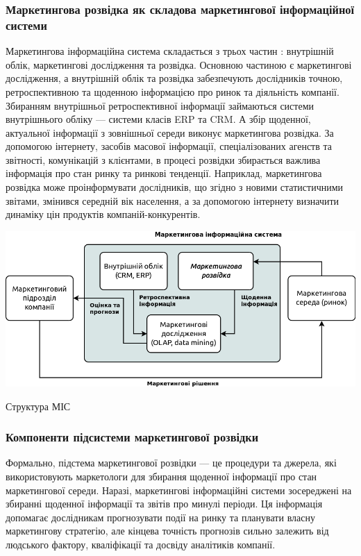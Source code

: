         \subsubsection{Маркетингова розвідка як складова маркетингової інформаційної системи}
Маркетингова інформаційна система складається з трьох частин \cite{kotler14}: внутрішній облік, маркетингові дослідження та розвідка. Основною частиною є маркетингові дослідження, а внутрішній облік та розвідка забезпечують дослідників точною, ретроспективною та щоденною інформацією про ринок та діяльність компанії. Збиранням внутрішньої ретроспективної інформації займаються системи внутрішнього обліку --- системи класів ERP та CRM. А збір щоденної, актуальної інформації з зовнішньої середи виконує маркетингова розвідка. За допомогою інтернету, засобів масової інформації, спеціалізованих агенств та звітності, комунікацій з клієнтами, в процесі розвідки збирається важлива інформація про стан ринку та ринкові тенденції. Наприклад, маркетингова розвідка може проінформувати дослідників, що згідно з новими статистичними звітами, змінився середній вік населення, а за допомогою інтернету визначити динаміку цін продуктів компаній-конкурентів.
 
            \begin{stdfigure}
                \includegraphics[width=7in]{images/mis_structure.png}
                \caption{Структура МІС}
                \label{fig:mis_structure}
            \end{stdfigure}    
   
        \subsubsection{Компоненти підсистеми маркетингової розвідки}
Формально, підстема маркетингової розвідки --- це процедури та джерела, які використовують маркетологи для збирання щоденної інформації про стан маркетингової середи\cite{kotler14}. Наразі, маркетингові інформаційні системи зосереджені на збиранні щоденної інформації та звітів про минулі періоди. Ця інформація допомагає дослідникам прогнозувати події на ринку та планувати власну маркетингову стратегію, але кінцева точність прогнозів сильно залежить від людського фактору, кваліфікації та досвіду аналітиків компанії.
 
